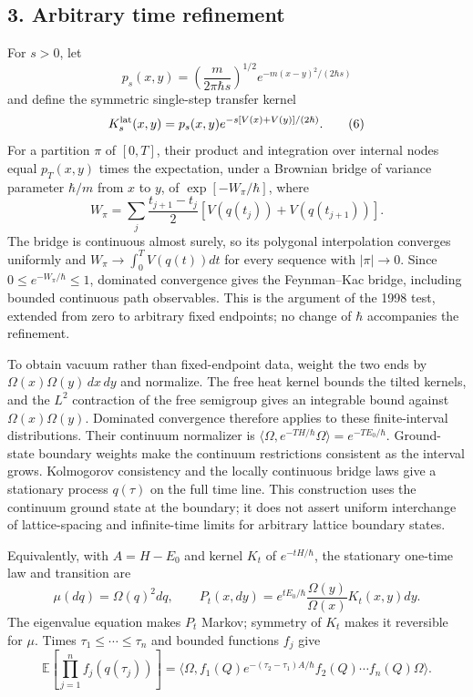 \documentclass[11pt,a4paper]{article}
\begin{document}
\hypertarget{arbitrary-time-refinement}{%
\subsection{3. Arbitrary time
refinement}\label{arbitrary-time-refinement}}

For \(s>0\), let \[p_s(x,y)=\left(\frac{m}{2\pi\hbar s}\right)^{1/2}
e^{-m(x-y)^2/(2\hbar s)}\] and define the symmetric single-step transfer
kernel \[K_s^{\rm lat}(x,y)=p_s(x,y)
e^{-s[V(x)+V(y)]/(2\hbar)}.\tag{6}\] For a partition \(\pi\) of
\([0,T]\), their product and integration over internal nodes equal
\(p_T(x,y)\) times the expectation, under a Brownian bridge of variance
parameter \(\hbar/m\) from \(x\) to \(y\), of \(\exp[-W_\pi/\hbar]\),
where \[W_\pi=\sum_j\frac{t_{j+1}-t_j}{2}
       [V(q(t_j))+V(q(t_{j+1}))].\tag{7}\] The bridge is continuous
almost surely, so its polygonal interpolation converges uniformly and
\(W_\pi\to\int_0^T V(q(t))dt\) for every sequence with \(|\pi|\to0\).
Since \(0\le e^{-W_\pi/\hbar}\le1\), dominated convergence gives the
Feynman--Kac bridge, including bounded continuous path observables. This
is the argument of the 1998 test, extended from zero to arbitrary fixed
endpoints; no change of \(\hbar\) accompanies the refinement.

To obtain vacuum rather than fixed-endpoint data, weight the two ends by
\(\Omega(x)\Omega(y)\,dx\,dy\) and normalize. The free heat kernel
bounds the tilted kernels, and the \(L^2\) contraction of the free
semigroup gives an integrable bound against \(\Omega(x)\Omega(y)\).
Dominated convergence therefore applies to these finite-interval
distributions. Their continuum normalizer is
\(\langle\Omega,e^{-TH/\hbar}\Omega\rangle=e^{-TE_0/\hbar}\).
Ground-state boundary weights make the continuum restrictions consistent
as the interval grows. Kolmogorov consistency and the locally continuous
bridge laws give a stationary process \(q(\tau)\) on the full time line.
This construction uses the continuum ground state at the boundary; it
does not assert uniform interchange of lattice-spacing and infinite-time
limits for arbitrary lattice boundary states.

Equivalently, with \(A=H-E_0\) and kernel \(K_t\) of \(e^{-tH/\hbar}\),
the stationary one-time law and transition are
\[\mu(dq)=\Omega(q)^2dq,\qquad
 P_t(x,dy)=e^{tE_0/\hbar}\frac{\Omega(y)}{\Omega(x)}K_t(x,y)dy.\tag{8}\]
The eigenvalue equation makes \(P_t\) Markov; symmetry of \(K_t\) makes
it reversible for \(\mu\). Times \(\tau_1\le\cdots\le\tau_n\) and
bounded functions \(f_j\) give
\[\mathbb E\!\left[\prod_{j=1}^n f_j(q(\tau_j))\right]
=\langle\Omega,f_1(Q)e^{-(\tau_2-\tau_1)A/\hbar}f_2(Q)
 \cdots f_n(Q)\Omega\rangle.\tag{9}\]
\end{document}
